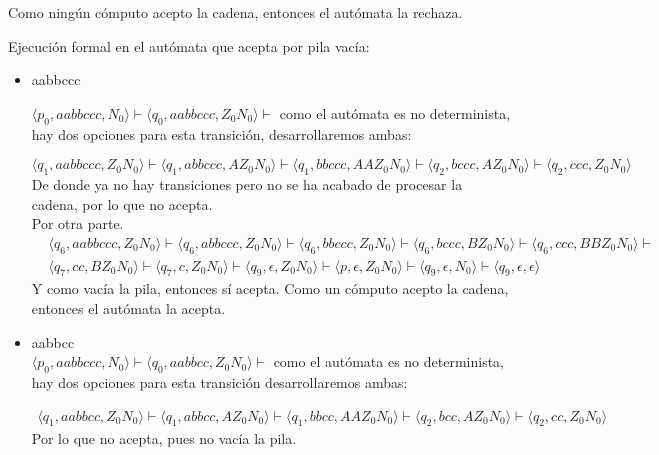 \documentclass{article}
\begin{document}
\begin{enumerate}
{\begin{enumerate}
{\begin{itemize}
{        		Como ningún cómputo acepto la cadena, entonces el autómata la rechaza.
        		}
			\end{itemize}

			Ejecución formal en el autómata que acepta por pila vacía:
        	\begin{itemize}
        		\item {
				aabbccc

				$\langle p_0, aabbccc, N_0 \rangle \vdash \langle q_0, aabbccc,
				Z_0N_0 \rangle \vdash$
				como el autómata es no determinista, hay dos opciones para esta transición,
				desarrollaremos ambas:

        		\[
					\langle q_1, aabbccc, Z_0N_0 \rangle \vdash
					\langle q_1, abbccc, AZ_0N_0 \rangle \vdash
					\langle q_1, bbccc, AAZ_0N_0 \rangle \vdash
					\langle q_2, bccc, AZ_0N_0 \rangle \vdash
					\langle q_2, ccc, Z_0N_0 \rangle
				\]
				De donde ya no hay transiciones pero no se ha acabado de
				procesar la cadena, por lo que no acepta.\\
				Por otra parte.
        		\begin{align*}
					&\langle q_6, aabbccc, Z_0N_0 \rangle \vdash
					\langle q_6, abbccc, Z_0N_0 \rangle \vdash
					\langle q_6, bbccc, Z_0N_0 \rangle \vdash
					\langle q_6, bccc, BZ_0N_0 \rangle \vdash
					\langle q_6, ccc, BBZ_0N_0 \rangle \vdash \\
					&\langle q_7, cc, BZ_0N_0 \rangle \vdash
					\langle q_7, c, Z_0N_0 \rangle \vdash
					\langle q_9, \epsilon, Z_0N_0 \rangle \vdash
					\langle p, \epsilon, Z_0N_0 \rangle \vdash
					\langle q_9, \epsilon, N_0 \rangle \vdash
					\langle q_9, \epsilon, \epsilon \rangle
				\end{align*}
				Y como vacía la pila, entonces sí acepta.
        		Como un cómputo acepto la cadena, entonces el autómata la acepta.
        		}
        		\item {
        		aabbcc \\
				$\langle p_0, aabbccc, N_0 \rangle \vdash \langle q_0, aabbcc,
				Z_0N_0 \rangle \vdash$ como el autómata es no
				determinista, hay dos opciones para esta transición
				desarrollaremos ambas:

				\begin{align*}
					\langle q_1, aabbcc, Z_0N_0 \rangle \vdash
					\langle q_1, abbcc, AZ_0N_0 \rangle \vdash
					\langle q_1, bbcc, AAZ_0N_0 \rangle \vdash
					\langle q_2, bcc, AZ_0N_0 \rangle \vdash
					\langle q_2, cc, Z_0N_0 \rangle
				\end{align*}
				Por lo que no acepta, pues no vacía la pila.

}
\end{itemize}}
\end{enumerate}}
\end{enumerate}
\end{document}
